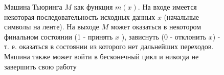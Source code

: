 \begin{figure}
\centering



\caption{Машина Тьюринга $M$ как функция $m(x)$. На входе имеется некоторая
  последовательность исходных данных $x$ (начальные символы на ленте).
На выходе $M$ может оказаться в некотором финальном состоянии
(1 - принять $x$ ), зависнуть (0 - отклонить $x$) - т. е. оказаться в
состоянии из которого нет дальнейших переходов. Машина также может
войти в бесконечный цикл и никогда не завершить свою работу} 
\label{figAddAlgoDecidability}
\end{figure}
